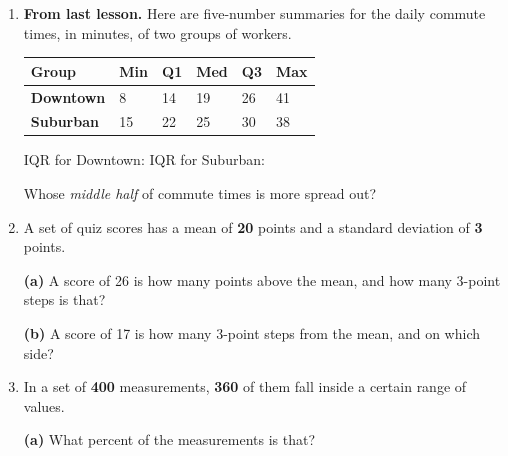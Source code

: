 \documentclass[12pt]{article}
\begin{document}

\vspace{0.12in}

\begin{enumerate}[leftmargin=1.7em, itemsep=0.13in]

  \item \textbf{From last lesson.} Here are five-number summaries for the daily commute times,
        in minutes, of two groups of workers.

        \vspace{3pt}
        \renewcommand{\arraystretch}{1.25}
        \begin{tabularx}{\linewidth}{@{} l Y Y Y Y Y @{}}
        \textbf{Group} & \textbf{Min} & \textbf{Q1} & \textbf{Med} & \textbf{Q3} & \textbf{Max} \\
        \hline
        \textbf{Downtown} & 8 & 14 & 19 & 26 & 41 \\
        \textbf{Suburban} & 15 & 22 & 25 & 30 & 38 \\
        \end{tabularx}
        \vspace{4pt}

        IQR for Downtown:  \qquad IQR for Suburban: 

        \vspace{3pt}
        Whose \emph{middle half} of commute times is more spread out? 

  \item A set of quiz scores has a mean of \textbf{20} points and a standard deviation of
        \textbf{3} points.

        \vspace{3pt}
        \hspace{1.0em}\textbf{(a)} A score of 26 is how many points above the mean, and how many
        3-point steps is that? 
        \vspace{3pt}

        \hspace{1.0em}\textbf{(b)} A score of 17 is how many 3-point steps from the mean, and on
        which side? 

  \item In a set of \textbf{400} measurements, \textbf{360} of them fall inside a certain range
        of values.

        \vspace{3pt}
        \hspace{1.0em}\textbf{(a)} What percent of the measurements is that? 
        \vspace{3pt}


\end{enumerate}
\end{document}
